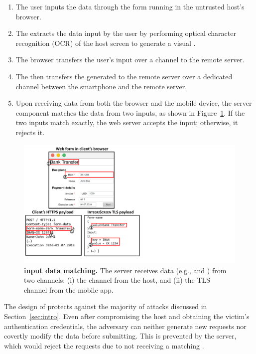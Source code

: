 \begin{enumerate}
  \item[\one] The user inputs the data through the form running in the untrusted host's browser.

  \item[\two] The \app extracts the data input by the user by performing optical character recognition (OCR) of the host screen to generate a visual \POI.

  \item[\three] The browser transfers the user's input over a \https channel to the remote server.

  \item[\four] The \app then transfers the generated \POI to the remote server over a dedicated \tls channel between the smartphone and the remote server.

  \item[\five] Upon receiving data from both the browser and the mobile device, the \name server component matches the data from two inputs, as shown in Figure~\ref{fig:traceMatching}.
  If the two inputs match exactly, the web server accepts the input; otherwise, it rejects it.
\end{enumerate}



\begin{figure}[t]
    \centering
    \includegraphics[trim={0 1cm 14cm 0},clip,width=0.7\linewidth]{chapters/IntegriScreen/img/inputMatching.pdf}
\caption[\sysname input data matching.]{\textbf{\sysname input data matching.}
        The server receives data (e.g., \one and \two) from two channels: (i) the \https channel from the host, and (ii) the TLS channel from the \name mobile app.}
    \label{fig:traceMatching}
    \vspace{0.3cm}
\end{figure}



The design of \sysname protects against the majority of attacks discussed in Section~\ref{sec:intro}.
Even after compromising the host and obtaining the victim's authentication credentials, the adversary can neither generate new requests nor covertly modify the data before submitting.
This is prevented by the server, which would reject the requests due to not receiving a matching \POI.


